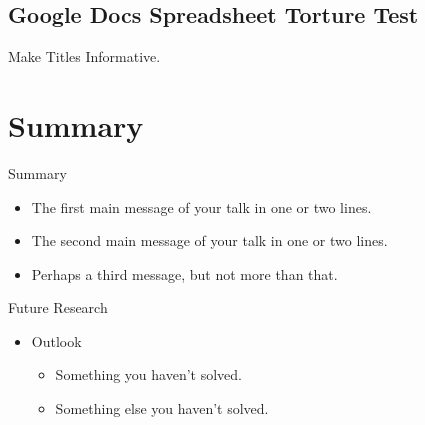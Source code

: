 \documentclass{beamer}
\begin{document}
\subsection[GDocs Spreadsheet Testing]{Google Docs Spreadsheet Torture Test}

\begin{frame}{Make Titles Informative.}
\end{frame}

\section*{Summary}

\begin{frame}{Summary}

\begin{itemize}
  \item The \alert{first main message} of your talk in one or two lines.
  \item The \alert{second main message} of your talk in one or two lines.
  \item Perhaps a \alert{third message}, but not more than that.
\end{itemize}

\end{frame}

\begin{frame}{Future Research}
\begin{itemize}
  \item Outlook
  \begin{itemize}
    \item Something you haven't solved.
    \item Something else you haven't solved.
  \end{itemize}
  \end{itemize}
\end{frame}
\end{document}
